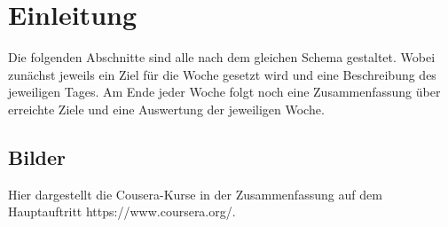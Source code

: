 \documentclass[12pt,a4paper,bibliography=totocnumbered,listof=totocnumbered]{scrartcl}
\begin{document}
\renewcommand{\lstlistlistingname}{Listing-Verzeichnis}
{\lstlistoflistings}
\pagebreak



\renewcommand{\sectionmark}[1]{\markright{#1}}
\renewcommand{\subsectionmark}[1]{}
\renewcommand{\subsubsectionmark}[1]{}
\rhead{\rightmark}

\onehalfspacing
\renewcommand{\thesection}{\arabic{section}}
\renewcommand{\theHsection}{\arabic{section}}
\setcounter{section}{0}
\setcounter{page}{1}

\section{Einleitung}
Die folgenden Abschnitte sind alle nach dem gleichen Schema gestaltet. Wobei zunächst jeweils ein Ziel für die Woche gesetzt wird und eine Beschreibung des jeweiligen Tages. Am Ende jeder Woche folgt noch eine Zusammenfassung über erreichte Ziele und eine Auswertung der jeweiligen Woche. 

\subsection{Bilder}
Hier dargestellt die Cousera-Kurse in der Zusammenfassung auf dem Hauptauftritt \textcolor[rgb]{0,0,1}{https://www.coursera.org/}.  
\end{document}

